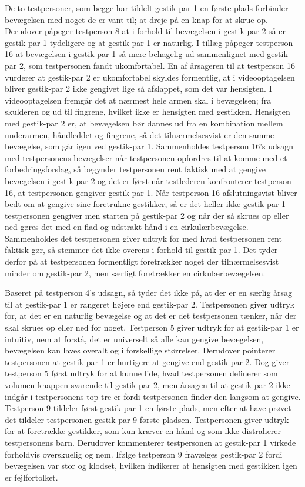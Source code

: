 De to testpersoner, som begge har tildelt gestik-par 1 en første plads forbinder bevægelsen med noget de er vant til; at dreje på en knap for at skrue op. Derudover påpeger testperson 8 at i forhold til bevægelsen i gestik-par 2 så er gestik-par 1 tydeligere og at gestik-par 1 er naturlig. I tillæg påpeger testperson 16 at bevægelsen i gestik-par 1 så mere behagelig ud sammenlignet med gestik-par 2, som testpersonen fandt ukomfortabel. En af årsageren til at testperson 16 vurderer at gestik-par 2 er ukomfortabel skyldes formentlig, at i videooptagelsen bliver gestik-par 2 ikke gengivet lige så afslappet, som det var hensigten. I videooptagelsen fremgår det at nærmest hele armen skal i bevægelsen; fra skulderen og ud til fingrene, hvilket ikke er hensigten med gestikken. Hensigten med gestik-par 2 er, at bevægelsen bør dannes ud fra en kombination mellem underarmen, håndleddet og fingrene, så det tilnærmelsesvist er den samme bevægelse, som går igen ved gestik-par 1. Sammenholdes testperson 16's udsagn med testpersonens bevægelser når testpersonen opfordres til at komme med et forbedringsforslag, så begynder testpersonen rent faktisk med at gengive bevægelsen i gestik-par 2 og det er først når testlederen konfronterer testperson 16, at testpersonen gengiver gestik-par 1. Når testperson 16 afslutningsvist bliver bedt om at gengive sine foretrukne gestikker, så er det heller ikke gestik-par 1 testpersonen gengiver men starten på gestik-par 2 og når der så skrues op eller ned gøres det med en flad og udstrakt hånd i en cirkulærbevægelse. Sammenholdes det testpersonen giver udtryk for med hvad testpersonen rent faktisk gør, så stemmer det ikke overens i forhold til gestik-par 1. Det tyder derfor på at testpersonen formentligt foretrækker noget der tilnærmelsesvist minder om gestik-par 2, men særligt foretrækker en cirkulærbevægelsen. 

Baseret på testperson 4's udsagn, så tyder det ikke på, at der er en særlig årsag til at gestik-par 1 er rangeret højere end gestik-par 2. Testpersonen giver udtryk for, at det er en naturlig bevægelse og at det er det testpersonen tænker, når der skal skrues op eller ned for noget. Testperson 5 giver udtryk for at gestik-par 1 er intuitiv, nem at forstå, det er universelt så alle kan gengive bevægelsen, bevægelsen kan laves overalt og i forskellige størrelser. Derudover pointerer testpersonen at gestik-par 1 er hurtigere at gengive end gestik-par 2. Dog giver testperson 5 først udtryk for at kunne lide, hvad testpersonen definerer som volumen-knappen svarende til gestik-par 2, men årsagen til at gestik-par 2 ikke indgår i testpersonens top tre er fordi testpersonen finder den langsom at gengive. Testperson 9 tildeler først gestik-par 1 en første plads, men efter at have prøvet det tildeler testpersonen gestik-par 9 første pladsen. Testpersonen giver udtryk for at foretrække gestikker, som kun kræver en hånd og som ikke distraherer testpersonens barn. Derudover kommenterer testpersonen at gestik-par 1 virkede forholdvis overskuelig og nem. Ifølge testperson 9 fravælges gestik-par 2 fordi bevægelsen var stor og klodset, hvilken indikerer at hensigten med gestikken igen er fejlfortolket. 

